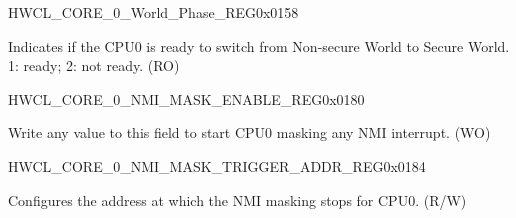 \begin{register}{H}{WCL\_CORE\_0\_World\_Phase\_REG}{0x{}0158}\label{regdesc:WCLCORE0WORLDPHASEREG}
%
%
\regnewline%
\begin{regdesc}\begin{reglist}
\label{fielddesc:WCLCORE0WORLDPHASE}\item [WCL\_CORE\_0\_WORLD\_PHASE] Indicates if the CPU0 is ready to switch from Non-secure World to Secure World. 1: ready; 2: not ready. (RO)
\end{reglist}\end{regdesc}
\end{register}
















\begin{register}{H}{WCL\_CORE\_0\_NMI\_MASK\_ENABLE\_REG}{0x{}0180}\label{regdesc:WCLCORE0NMIMASKENABLEREG}
%
\regnewline%
\begin{regdesc}\begin{reglist}
\label{fielddesc:WCLCORE0NMIMASKENABLE}\item [WCL\_CORE\_0\_NMI\_MASK\_ENABLE] Write any value to this field to start CPU0 masking any NMI interrupt. (WO)
\end{reglist}\end{regdesc}
\end{register}


\begin{register}{H}{WCL\_CORE\_0\_NMI\_MASK\_TRIGGER\_ADDR\_REG}{0x{}0184}\label{regdesc:WCLCORE0NMIMASKTRIGGERADDRREG}
%
\regnewline%
\begin{regdesc}\begin{reglist}
\label{fielddesc:WCLCORE0NMIMASKTRIGGERADDR}\item [WCL\_CORE\_0\_NMI\_MASK\_TRIGGER\_ADDR] Configures the address at which the NMI masking stops for CPU0. (R/W)
\end{reglist}\end{regdesc}
\end{register}


